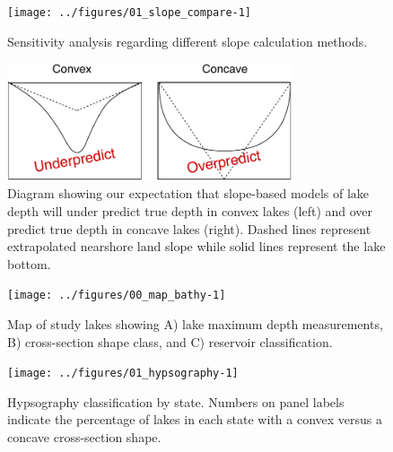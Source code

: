 \documentclass[draft,wrr]{agutexSI2019}
\begin{document}
\begin{article}
%
%
\end{article}
\clearpage

\begin{figure}
      \begin{center}
        \texttt{[image: ../figures/01\_slope\_compare-1]}
      \end{center}
      \caption{Sensitivity analysis regarding different slope calculation methods.}\label{figS1}
    \end{figure}
\clearpage

\begin{figure}
      \begin{center}
        \includegraphics[width=0.75\textwidth,keepaspectratio]{../figures/lake_shape}
      \end{center}
      \caption{Diagram showing our expectation that slope-based models of lake depth will under predict true depth in convex lakes (left) and over predict true depth in concave lakes (right). Dashed lines represent extrapolated nearshore land slope while solid lines represent the lake bottom.}\label{figS1}
    \end{figure}

\clearpage

\begin{figure}
      \begin{center}\texttt{[image: ../figures/00\_map\_bathy-1]}\end{center}
      \caption{Map of study lakes showing A) lake maximum depth measurements, B) cross-section shape class, and C) reservoir classification.}\label{figS2}
      \end{figure}

\begin{figure}
      \noindent\texttt{[image: ../figures/01\_hypsography-1]}
      \caption{Hypsography classification by state. Numbers on panel labels indicate the percentage of lakes in each state with a convex versus a concave cross-section shape.}\label{figS3}
      \end{figure}
\end{document}
